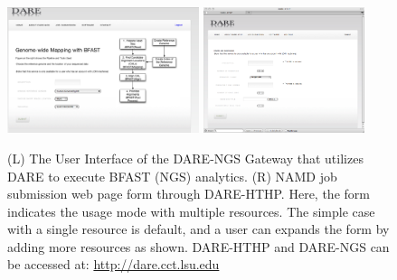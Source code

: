 \documentclass[]{svjour3}
\begin{document}
\begin{figure}
 \centering
\includegraphics[width=0.5\textwidth]{figures/screenshot-ngs.png} \hspace{0.1in}
\includegraphics[width=0.42\textwidth]{figures/screenshot-hthp.png}
\caption{\small (L) The User Interface of the DARE-NGS Gateway that
  utilizes DARE to execute BFAST (NGS) analytics. (R) NAMD job
  submission web page form through DARE-HTHP. Here, the form indicates
  the usage mode with multiple resources. The simple case with a
  single resource is default, and a user can expands the form by
  adding more resources as shown. DARE-HTHP and DARE-NGS can be
  accessed at: \url{http://dare.cct.lsu.edu} }
  \label{fig:NAMD2}
\end{figure}

\end{document}
